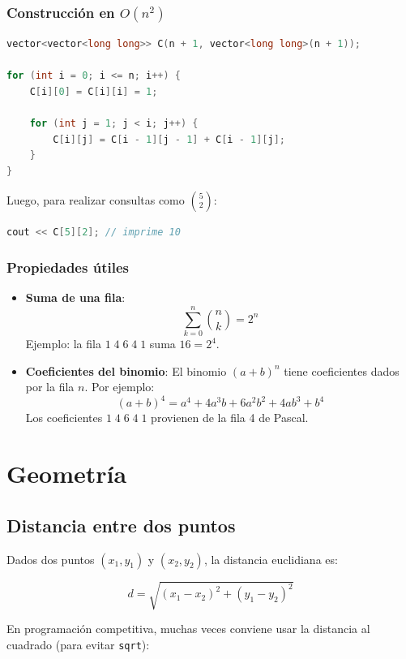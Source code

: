 \subsubsection*{Construcción en $O(n^2)$}
\begin{lstlisting}[language=C++, caption={Construcción del triángulo de Pascal}]
vector<vector<long long>> C(n + 1, vector<long long>(n + 1));

for (int i = 0; i <= n; i++) {
	C[i][0] = C[i][i] = 1;

	for (int j = 1; j < i; j++) {
		C[i][j] = C[i - 1][j - 1] + C[i - 1][j];
	}
}
\end{lstlisting}

Luego, para realizar consultas como \(\binom{5}{2}\):
\begin{lstlisting}[language=C++, caption={Ejemplo de consulta}]
cout << C[5][2]; // imprime 10
\end{lstlisting}

\subsubsection*{Propiedades útiles}
\begin{itemize}
	\item \textbf{Suma de una fila}:
	\[
	\sum_{k=0}^{n} \binom{n}{k} = 2^n
	\]
	Ejemplo: la fila $1\;4\;6\;4\;1$ suma $16 = 2^4$.
	
	\item \textbf{Coeficientes del binomio}:
	El binomio $(a+b)^n$ tiene coeficientes dados por la fila $n$.
	Por ejemplo:
	\[
	(a+b)^4 = a^4 + 4a^3b + 6a^2b^2 + 4ab^3 + b^4
	\]
	Los coeficientes $1\;4\;6\;4\;1$ provienen de la fila 4 de Pascal.
\end{itemize}

\section{Geometría}

\subsection{Distancia entre dos puntos}
Dados dos puntos \((x_1, y_1)\) y \((x_2, y_2)\), la distancia euclidiana es:

\[
d = \sqrt{(x_1-x_2)^2 + (y_1-y_2)^2}
\]

En programación competitiva, muchas veces conviene usar la distancia al cuadrado (para evitar \texttt{sqrt}):

